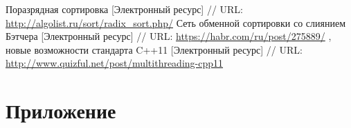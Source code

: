 \documentclass{report}
\begin{document}
\newpage
\begin{thebibliography}{1}
 Поразрядная сортировка [Электронный ресурс] // URL: \url{http://algolist.ru/sort/radix_sort.php/}
 Сеть обменной сортировки со слиянием Бэтчера [Электронный ресурс] // URL: \url{https://habr.com/ru/post/275889/}
, новые возможности стандарта C++11 [Электронный ресурс] // URL: \url{http://www.quizful.net/post/multithreading-cpp11}
\end{thebibliography}

\newpage
\section*{Приложение}
\end{document}
